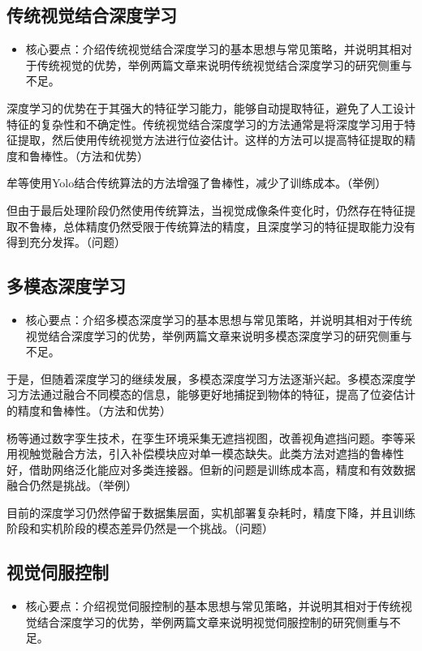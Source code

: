 \documentclass{Diploma}
\begin{document}
\subsection{传统视觉结合深度学习}
\begin{itemize}
  \item 核心要点：介绍传统视觉结合深度学习的基本思想与常见策略，并说明其相对于传统视觉的优势，举例两篇文章来说明传统视觉结合深度学习的研究侧重与不足。
\end{itemize}

深度学习的优势在于其强大的特征学习能力，能够自动提取特征，避免了人工设计特征的复杂性和不确定性。传统视觉结合深度学习的方法通常是将深度学习用于特征提取，然后使用传统视觉方法进行位姿估计。这样的方法可以提高特征提取的精度和鲁棒性。（方法和优势）

牟等使用Yolo结合传统算法的方法增强了鲁棒性，减少了训练成本。（举例）

但由于最后处理阶段仍然使用传统算法，当视觉成像条件变化时，仍然存在特征提取不鲁棒，总体精度仍然受限于传统算法的精度，且深度学习的特征提取能力没有得到充分发挥。（问题）
\subsection{多模态深度学习}
\begin{itemize}
  \item 核心要点：介绍多模态深度学习的基本思想与常见策略，并说明其相对于传统视觉结合深度学习的优势，举例两篇文章来说明多模态深度学习的研究侧重与不足。
\end{itemize}

于是，但随着深度学习的继续发展，多模态深度学习方法逐渐兴起。多模态深度学习方法通过融合不同模态的信息，能够更好地捕捉到物体的特征，提高了位姿估计的精度和鲁棒性。（方法和优势）

杨等通过数字孪生技术，在孪生环境采集无遮挡视图，改善视角遮挡问题。李等采用视触觉融合方法，引入补偿模块应对单一模态缺失。此类方法对遮挡的鲁棒性好，借助网络泛化能应对多类连接器。但新的问题是训练成本高，精度和有效数据融合仍然是挑战。（举例）

目前的深度学习仍然停留于数据集层面，实机部署复杂耗时，精度下降，并且训练阶段和实机阶段的模态差异仍然是一个挑战。（问题）

\subsection{视觉伺服控制}
\begin{itemize}
  \item 核心要点：介绍视觉伺服控制的基本思想与常见策略，并说明其相对于传统视觉结合深度学习的优势，举例两篇文章来说明视觉伺服控制的研究侧重与不足。
\end{itemize}
\end{document}
